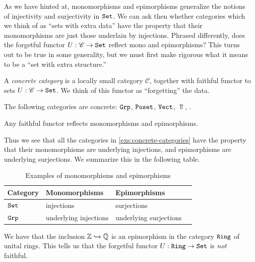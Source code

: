 \documentclass{article}[11pt]
\begin{document}
As we have hinted at, monomorphisms and epimorphisms generalize the notions of injectivity and surjectivity in $\texttt{Set}$. We can ask then whether categories which we think of as ``sets with extra data'' have the property that their monomorphisms are just those underlain by injections. Phrased differently, does the forgetful functor $U: \mathscr{C} \to \texttt{Set}$ reflect mono and epimorphisms? This turns out to be true in some generality, but we must first make rigorous what it means to be a ``set with extra structure.''

\begin{definition}\label{def:concrete-category} A \textit{concrete category} is a locally small category $\mathscr{C}$, together with faithful functor to sets $U : \mathscr{C} \to \texttt{Set}$. We think of this functor as ``forgetting'' the data.
\end{definition}

\begin{examples}\label{exs:concrete-categories} The following categories are concrete: $\texttt{Grp}$, $\texttt{Poset}$, $\texttt{Vect}$, $\Top$, .
\end{examples}


\begin{proposition} Any faithful functor reflects monomorphisms and epimorphisms.
\end{proposition}

Thus we see that all the categories in \autoref{exs:concrete-categories} have the property that their monomorphisms are underlying injections, and epimorphisms are underlying surjections. We summarize this in the following table.

\begin{table}[h]
    \centering
    \caption{Examples of monomorphisms and epimorphisms}
    \begin{tabular}{ p{2cm} l  p{5cm}  p{8cm} }
        \toprule
\textbf{Category}      
& \textbf{Monomorphisms}   
& \textbf{Epimorphisms} \\\midrule
$\texttt{Set}$ & injections & surjections \\\hline

$\texttt{Grp}$ & underlying injections & underlying surjections  \\\hline	 \bottomrule
    \end{tabular}
\end{table}


\begin{counterexample} We have that the inclusion $\mathbb{Z} \xhookrightarrow{} \mathbb{Q}$ is an epimorphism in the category $\texttt{Ring}$ of unital rings. This tells us that the forgetful functor $U: \texttt{Ring} \to \texttt{Set}$ is \textit{not} faithful.
\end{counterexample}

























\newpage
\printindex[ind]
\end{document}
